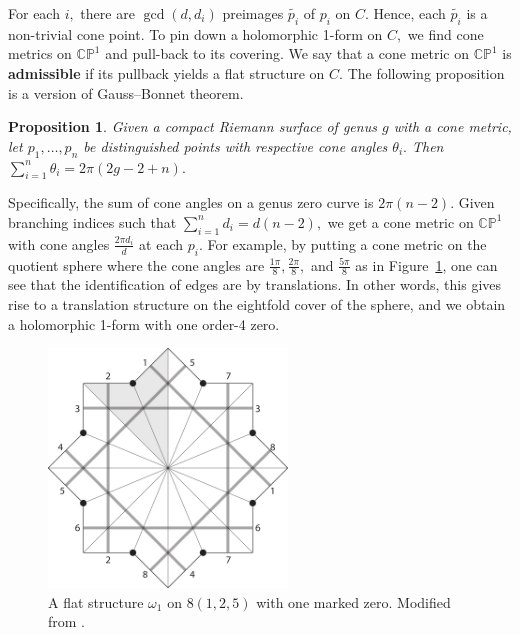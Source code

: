 \documentclass[12pt,reqno]{amsart}
\newtheorem*{proposition}{Proposition}
\theoremstyle{definition}
\theoremstyle{remark}
\begin{document}

For each $i,$ there are $\gcd(d, d_i)$ preimages $\widetilde{p_i}$ of $p_i$ on $C.$ Hence, each $\widetilde{p_i}$ is a non-trivial cone point. To pin down a holomorphic 1-form on $C,$ we find cone metrics on $\mathbb{C}\mathbb{P}^1$ and pull-back to its covering. We say that a cone metric on $\mathbb{C}\mathbb{P}^1$ is \textbf{admissible} if its pullback yields a flat structure on $C.$ The following proposition is a version of Gauss--Bonnet theorem.

\begin{proposition} Given a compact Riemann surface of genus $g$ with a cone metric, let $p_1, \ldots, p_n$ be distinguished points with respective cone angles $\theta_i.$ Then $\sum\limits_{i=1}^n \theta_i = 2 \pi (2 g - 2 + n).$
\end{proposition}

Specifically, the sum of cone angles on a genus zero curve is $2 \pi (n - 2).$ Given branching indices such that $\sum\limits_{i=1}^n d_i = d (n - 2),$ we get a cone metric on $\mathbb{C}\mathbb{P}^1$ with cone angles $\frac{2 \pi d_i}{d}$ at each $p_i.$ For example, by putting a cone metric on the quotient sphere where the cone angles are $\frac{1 \pi}{8}, \frac{2 \pi}{8},$ and $\frac{5 \pi}{8}$ as in Figure~\ref{fig:125_flat}, one can see that the identification of edges are by translations. In other words, this gives rise to a translation structure on the eightfold cover of the sphere, and we obtain a holomorphic 1-form with one order-4 zero.

\begin{figure}[htbp]
   \centering
   \includegraphics[width=2.5in]{figures/125_flat.pdf} 
  \caption{A flat structure $\omega_1$ on $8(1, 2, 5)$ with one marked zero. Modified from \cite{dami}.}
  \label{fig:125_flat}
\end{figure}
\end{document}
